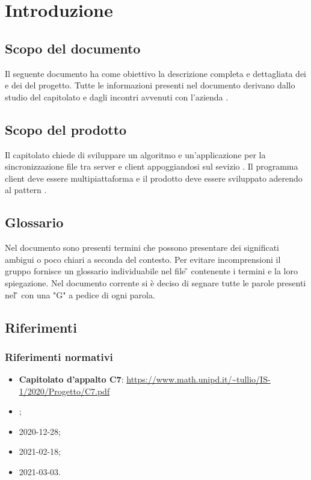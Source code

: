 \section{Introduzione}
\subsection{Scopo del documento}
Il seguente documento ha come obiettivo la descrizione completa e dettagliata dei  e dei  del progetto. Tutte le informazioni presenti nel documento derivano dallo studio del capitolato e dagli incontri avvenuti con l'azienda .

\subsection{Scopo del prodotto}
Il capitolato chiede di sviluppare un algoritmo e un'applicazione per la sincronizzazione file tra server e client appoggiandosi sul sevizio .
Il programma client deve essere multipiattaforma e il prodotto deve essere sviluppato aderendo al pattern .

\subsection{Glossario}
Nel documento sono presenti termini che possono presentare dei significati ambigui o poco chiari a seconda del contesto.
Per evitare incomprensioni il gruppo fornisce un glossario individuabile nel file \G{} \versGlo{} contenente i termini e la loro spiegazione.\newline{}
Nel documento corrente si è deciso di segnare tutte le parole presenti nel \G{} con una "G" a pedice di ogni parola.

\subsection{Riferimenti}
\subsubsection{Riferimenti normativi}
\begin{itemize}
\item \textbf{Capitolato d'appalto C7}:\newline
      \url{https://www.math.unipd.it/~tullio/IS-1/2020/Progetto/C7.pdf}
\item \NdP{} \versNdP{};
\item \VE{} 2020-12-28; %
\item \VE{} 2021-02-18; %
\item \VE{} 2021-03-03. %
\end{itemize}

